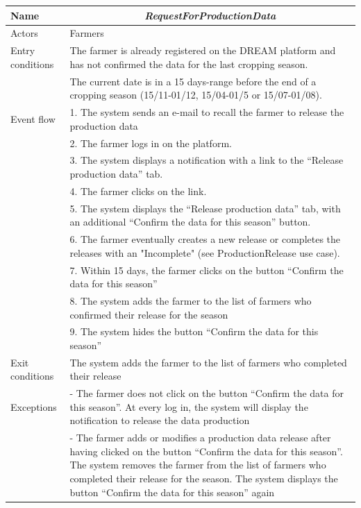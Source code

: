 \begin{table}[htbp]
	\centering
	\begin{tabularx}{\linewidth}{|l|X|}
		\hline
		Name & \multicolumn{1}{c|}{\textit{\textbf{RequestForProductionData}}}                                                   \tabularnewline \hline
		Actors                                               & Farmers                                                    \tabularnewline \hline
		Entry conditions                                        
		& The farmer is already registered on the DREAM platform and has not confirmed the data for the last cropping season.
		\tabularnewline
		&
		The current date is in a 15 days-range before the end of a cropping season (15/11-01/12, 15/04-01/5 or 15/07-01/08).
		\tabularnewline \hline
		Event flow                                         & 1.	The system sends an e-mail to recall the farmer to release the production data                                           \tabularnewline 
		& 2.	The farmer logs in on the platform.                                             \tabularnewline 
		& 3.	The system displays a notification with a link to the “Release production data” tab.                                           \tabularnewline 
		& 4.	The farmer clicks on the link.                                    \tabularnewline
		& 5.	The system displays the “Release production data” tab, with an additional “Confirm the data for this season” button.                                           \tabularnewline
		& 6.	The farmer eventually creates a new release or completes the releases with an "Incomplete" (see ProductionRelease use case).                                     \tabularnewline
		& 7.	Within 15 days, the farmer clicks on the button “Confirm the data for this season”                                \tabularnewline
		& 8.	The system adds the farmer to the list of farmers who confirmed their release for the season                              \tabularnewline
		& 9.	The system hides the button “Confirm the data for this season”                       \tabularnewline \hline
		Exit conditions 
		& The system adds the farmer to the list of farmers who completed their release 
		\tabularnewline \hline
		Exceptions 
		& 
		-	The farmer does not click on the button “Confirm the data for this season”. At every log in, the system will display the notification to release the data production
		\tabularnewline
		&
		-	The farmer adds or modifies a production data release after having clicked on the button “Confirm the data for this season”. The system removes the farmer from the list of farmers who completed their release for the season. The system displays the button “Confirm the data for this season” again
		\tabularnewline
		\hline
	\end{tabularx}   
\end{table}

